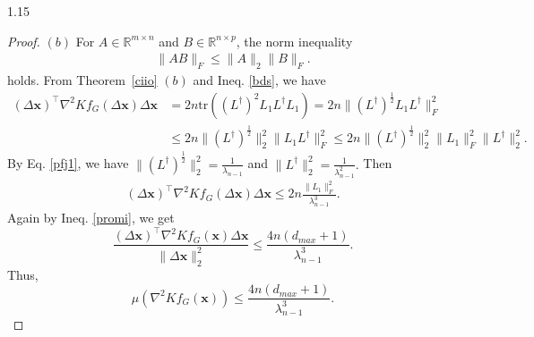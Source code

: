 \documentclass[preprint,12pt]{elsarticle1}
\numberwithin{equation}{section}
\begin{document}
\begin{spacing}{1.15}
\begin{proof}
$(b)$ For $A\in \mathbb{R}^{m\times n}$ and $B\in \mathbb{R}^{n\times p}$, the norm inequality \cite[p.~364]{horn2012matrix1}\begin{align}\label{bds}\|AB\|_{F}\leq \|A\|_{2}\|B\|_{F}.\end{align} holds.
From Theorem~\ref{ciio} $(b)$ and  Ineq.  \eqref{bds}, we have\begin{align}\label{K4} (\Delta \mathbf{x})^{\top} \nabla^{2} Kf_{G}(\Delta \mathbf{x}) \Delta \mathbf{\mathbf{x}}&=2n\textrm{tr} ( (L^\dag)^{2} L_{1} L^\dag L_{1})=2n\|(L^{\dag})^{\frac{1}{2}}L_{1}L^{\dag}\|^{2}_{F}\\ \nonumber
&\leq 2n\|(L^{\dag})^{\frac{1}{2}}\|_{2}^{2}\|L_{1}L^{\dag}\|_{F}^{2}
\leq 2n\|(L^{\dag})^{\frac{1}{2}}\|_{2}^{2}\|L_{1}\|_{F}^{2}\|L^{\dag}\|_{2}^{2}.
\end{align}
By Eq. \eqref{pfj1}, we have $\|(L^{\dag})^{\frac{1}{2}}\|_{2}^{2}=\frac{1}{\lambda_{n-1}}$
and $\|L^{\dag}\|_{2}^{2}=\frac{1}{\lambda_{n-1}^{2}}.$
Then \begin{align}\nonumber
(\Delta \mathbf{x})^{\top} \nabla^{2} Kf_{G}(\Delta \mathbf{x}) \Delta \mathbf{\mathbf{x}}\leq2n\frac{\|L_{1}\|_{F}^{2}}
{\lambda_{n-1}^{3}}.
\end{align}
Again by  Ineq.  \eqref{promi}, we get $$\frac{(\Delta \textbf{x})^{\top} \nabla^{2} Kf_{G}(\textbf{x})\Delta \textbf{x}}{\|\Delta \textbf{x} \|^{2}_{2}}\leq\frac{4n(d_{max}+1)}{\lambda_{n-1}^{3}}.$$
 Thus, $$\mu(\nabla^{2}Kf_{G}(\mathbf{x}))\leq \frac{4n(d_{max}+1)}{\lambda_{n-1}^3}.$$


\end{proof}
\end{spacing}
\end{document}
